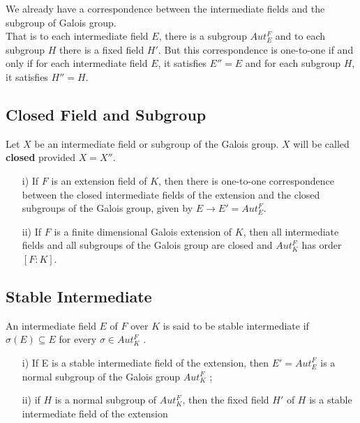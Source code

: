 \vspace{2mm}
We already have a correspondence between the intermediate fields and the subgroup of Galois group.\\
That is to each intermediate field \(E\), there is a subgroup \(Aut_E^F\) and to each subgroup \(H\) there is a fixed field \(H'\). But this correspondence is one-to-one if and only if for each intermediate field \(E\), it satisfies \(E''=E\) and for each subgroup \(H\), it satisfies \(H''=H\).

\subsection{Closed Field and Subgroup}
\begin{definition} \cite{hunger}
  Let \(X\) be an intermediate field or subgroup of the Galois group. \(X\) will be called \textbf{closed} provided \(X=X''\).
\end{definition}

\begin{lemma} \cite{hunger}
\begin{enumerate}
\item[i)] If \(F\) is an extension field of \(K\), then there is one-to-one correspondence between the closed intermediate fields of the extension and the closed subgroups of the Galois group, given by \(E \rightarrow E' =  Aut_E^F\).
\item[ii)] If \(F\) is a finite dimensional Galois extension of \(K\), then all intermediate fields and all subgroups of the Galois group are closed and \(Aut_K^F\) has order \([F:K]\).
  \end{enumerate}
\end{lemma}
\vspace{3mm}

\subsection{Stable Intermediate}
\begin{definition} \cite{hunger}
  An intermediate field \(E\) of \(F\) over \(K\) is said to be stable intermediate if \(\sigma(E) \subseteq E\) for every \(\sigma \in Aut_K^F\) .
\end{definition}

\begin{lemma} \cite{hunger}
  \begin{enumerate}
  \item[i)] If E is a stable intermediate field of the extension, then \(E'=Aut_E^F\) is a normal subgroup of the Galois group \(Aut_K^F\) ;

  \item[ii)] if \(H\) is a normal subgroup of \(Aut_K^F\), then the fixed field \(H'\) of \(H\) is a stable intermediate field of the extension
  \end{enumerate}
\end{lemma}
\vspace{3mm}

